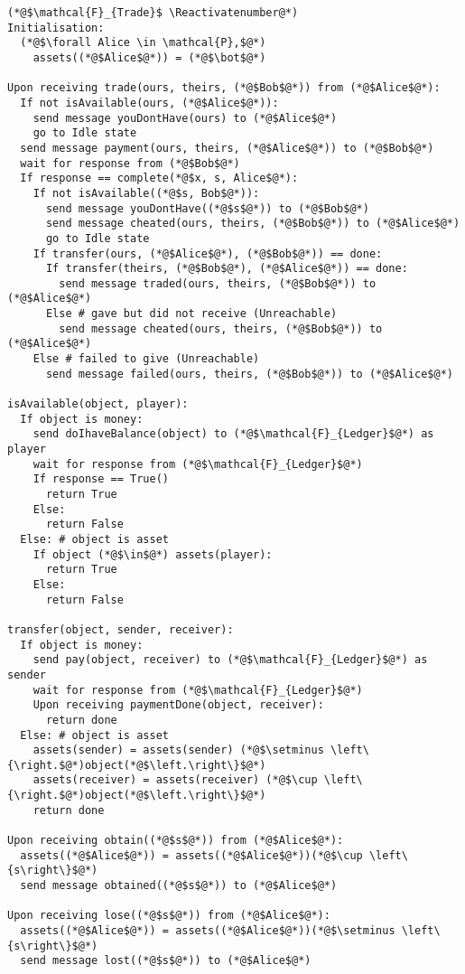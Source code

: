 \Suppressnumber
\begin{lstlisting}[label=tradefunc, style=numbers]
(*@$\mathcal{F}_{Trade}$ \Reactivatenumber@*)
Initialisation:
  (*@$\forall Alice \in \mathcal{P},$@*)
    assets((*@$Alice$@*)) = (*@$\bot$@*)

Upon receiving trade(ours, theirs, (*@$Bob$@*)) from (*@$Alice$@*):
  If not isAvailable(ours, (*@$Alice$@*)):
    send message youDontHave(ours) to (*@$Alice$@*)
    go to Idle state
  send message payment(ours, theirs, (*@$Alice$@*)) to (*@$Bob$@*)
  wait for response from (*@$Bob$@*)
  If response == complete(*@$x, s, Alice$@*):
    If not isAvailable((*@$s, Bob$@*)):
      send message youDontHave((*@$s$@*)) to (*@$Bob$@*)
      send message cheated(ours, theirs, (*@$Bob$@*)) to (*@$Alice$@*)
      go to Idle state
    If transfer(ours, (*@$Alice$@*), (*@$Bob$@*)) == done:
      If transfer(theirs, (*@$Bob$@*), (*@$Alice$@*)) == done:
        send message traded(ours, theirs, (*@$Bob$@*)) to (*@$Alice$@*)
      Else # gave but did not receive (Unreachable)
        send message cheated(ours, theirs, (*@$Bob$@*)) to (*@$Alice$@*)
    Else # failed to give (Unreachable)
      send message failed(ours, theirs, (*@$Bob$@*)) to (*@$Alice$@*)

isAvailable(object, player):
  If object is money:
    send doIhaveBalance(object) to (*@$\mathcal{F}_{Ledger}$@*) as player
    wait for response from (*@$\mathcal{F}_{Ledger}$@*)
    If response == True()
      return True
    Else:
      return False
  Else: # object is asset
    If object (*@$\in$@*) assets(player):
      return True
    Else:
      return False

transfer(object, sender, receiver):
  If object is money:
    send pay(object, receiver) to (*@$\mathcal{F}_{Ledger}$@*) as sender
    wait for response from (*@$\mathcal{F}_{Ledger}$@*)
    Upon receiving paymentDone(object, receiver):
      return done
  Else: # object is asset
    assets(sender) = assets(sender) (*@$\setminus \left\{\right.$@*)object(*@$\left.\right\}$@*)
    assets(receiver) = assets(receiver) (*@$\cup \left\{\right.$@*)object(*@$\left.\right\}$@*)
    return done

Upon receiving obtain((*@$s$@*)) from (*@$Alice$@*):
  assets((*@$Alice$@*)) = assets((*@$Alice$@*))(*@$\cup \left\{s\right\}$@*)
  send message obtained((*@$s$@*)) to (*@$Alice$@*)

Upon receiving lose((*@$s$@*)) from (*@$Alice$@*):
  assets((*@$Alice$@*)) = assets((*@$Alice$@*))(*@$\setminus \left\{s\right\}$@*)
  send message lost((*@$s$@*)) to (*@$Alice$@*)
\end{lstlisting}
